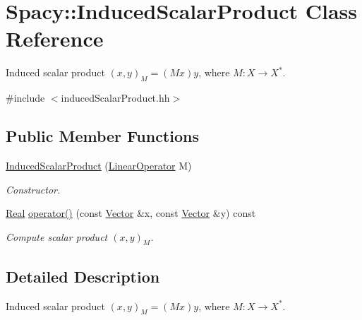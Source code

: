 \hypertarget{classSpacy_1_1InducedScalarProduct}{\section{\-Spacy\-:\-:\-Induced\-Scalar\-Product \-Class \-Reference}
\label{classSpacy_1_1InducedScalarProduct}
}


\-Induced scalar product $(x,y)_M = (Mx)y$, where $M:X\rightarrow X^*$.  




{\ttfamily \#include $<$induced\-Scalar\-Product.\-hh$>$}

\subsection*{\-Public \-Member \-Functions}
\begin{DoxyCompactItemize}
\item 
\hyperlink{classSpacy_1_1InducedScalarProduct_a8cf4d6c0823b6c9d59be783d3627130e}{\-Induced\-Scalar\-Product} (\hyperlink{classSpacy_1_1LinearOperator}{\-Linear\-Operator} \-M)
\begin{DoxyCompactList}\small\item\em \-Constructor. \end{DoxyCompactList}\item 
\hypertarget{classSpacy_1_1InducedScalarProduct_ab16021f05080b32714276f9b125df8af}{\hyperlink{classSpacy_1_1Real}{\-Real} \hyperlink{classSpacy_1_1InducedScalarProduct_ab16021f05080b32714276f9b125df8af}{operator()} (const \hyperlink{classSpacy_1_1Vector}{\-Vector} \&x, const \hyperlink{classSpacy_1_1Vector}{\-Vector} \&y) const }\label{classSpacy_1_1InducedScalarProduct_ab16021f05080b32714276f9b125df8af}

\begin{DoxyCompactList}\small\item\em \-Compute scalar product $(x,y)_M$. \end{DoxyCompactList}\end{DoxyCompactItemize}


\subsection{\-Detailed \-Description}
\-Induced scalar product $(x,y)_M = (Mx)y$, where $M:X\rightarrow X^*$. 

